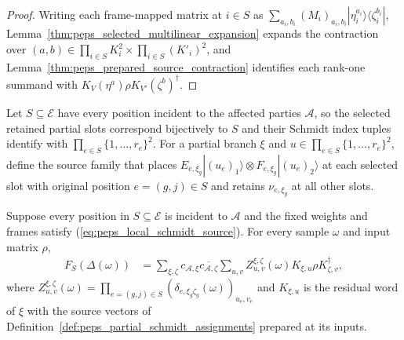 \begin{proof}\leanok
    Writing each frame-mapped matrix at $i\in S$ as $\sum_{a_i,b_i}(M_i)_{a_i,b_i}|\eta_i^{a_i}\rangle\langle\zeta_i^{b_i}|$, Lemma~\ref{thm:peps_selected_multilinear_expansion} expands the contraction over $(a,b)\in\prod_{i\in S}K_i^2\times\prod_{i\in S}(K'_i)^2$, and Lemma~\ref{thm:peps_prepared_source_contraction} identifies each rank-one summand with $K_V(\eta^a)\rho K_{V'}(\zeta^b)^{\dagger}$.
\end{proof}

\begin{definition}
    \label{def:peps_partial_schmidt_assignments}
    \leanok
    Let $S\subseteq\mathcal E$ have every position incident to the affected parties $\mathcal A$, so the selected retained partial slots correspond bijectively to $S$ and their Schmidt index tuples identify with $\prod_{e\in S}\{1,\ldots,r_e\}^2$. For a partial branch $\xi$ and $u\in\prod_{e\in S}\{1,\ldots,r_e\}^2$, define the source family that places $E_{e,\xi_g}|(u_e)_1\rangle\otimes F_{e,\xi_g}|(u_e)_2\rangle$ at each selected slot with original position $e=(g,j)\in S$ and retains $\nu_{e,\xi_g}$ at all other slots.
\end{definition}

\begin{lemma}
    \label{thm:peps_corrected_gaussian_sum}
    \leanok
    Suppose every position in $S\subseteq\mathcal E$ is incident to $\mathcal A$ and the fixed weights and frames satisfy (\ref{eq:peps_local_schmidt_source}). For every sample $\omega$ and input matrix $\rho$,
    \begin{align}
        F_S(\Delta(\omega))
         & =\sum_{\xi,\zeta}c_{\mathcal A,\xi}
        \overline{c_{\mathcal A,\zeta}}
        \sum_{u,v}Z^{\xi,\zeta}_{u,v}(\omega)
        K_{\xi,u}\rho K_{\zeta,v}^{\dagger},
        \label{eq:peps_corrected_gaussian_sum}
    \end{align}
    where $Z^{\xi,\zeta}_{u,v}(\omega)=\prod_{e=(g,j)\in S}(\delta_{e,\xi_g\zeta_g}(\omega))_{u_e,v_e}$ and $K_{\xi,u}$ is the residual word of $\xi$ with the source vectors of Definition~\ref{def:peps_partial_schmidt_assignments} prepared at its inputs.
\end{lemma}

